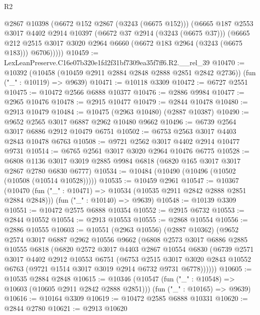 \begin{lexlean}{R2}
\begin{coremodule}
          @2867
          @10398
          (@6672 @152 @2867 (@3243 (@6675 @152)))
          (@6665
            @187
            @2553
            @3017
            @4402
            @2914
            @10397
            (@6672 @37 @2914 (@3243 (@6675 @37)))
            (@6665
              @212
              @2515
              @3017
              @3020
              @2964
              @6660
              (@6672 @183 @2964 (@3243 (@6675 @183)))
              @6706)))))
@10459 := LexLeanPreserve.C16e07b320e1fd2f31bf7309ea35f7ff6.R2.__rel_39
@10470 := @10392
    (@10458 (@10459 @2911 @2884 @2848 @2888 @2851 @2842 @2736))
    (fun ("_" : @10119) => @9639)
@10471 := @10118 @3309
@10472 := @6727 @2551
@10475 := @10472 @2566 @6888 @10377
@10476 := @2886 @9984
@10477 := @2965 @10476
@10478 := @2915 @10477
@10479 := @2844 @10478
@10480 := @2913 @10479
@10484 := @10475 (@2963 @10480) (@2887 @10387)
@10490 := @9652 @2565 @3017 @6887 @2962 @10480 @9662
@10496 := @6739 @2564 @3017 @6886 @2912 @10479 @6751
@10502 := @6753 @2563 @3017 @4403 @2843 @10478 @6763
@10508 := @9721 @2562 @3017 @4402 @2914 @10477 @9731
@10514 := @6765 @2561 @3017 @3020 @2964 @10476 @6775
@10528 := @6808 @1136 @3017 @3019 @2885 @9984 @6818 (@6820 @165 @3017 @3017 @2867 @2780 @6830 @6777)
@10534 := @10484 (@10490 (@10496 (@10502 (@10508 (@10514 @10528)))))
@10535 := @10459 @2961
@10547 := @10367
    (@10470 (fun ("_" : @10471) => @10534 (@10535 @2911 @2842 @2888 @2851 @2884 @2848)))
    (fun ("_" : @10140) => @9639)
@10548 := @10139 @3309
@10551 := @10472 @2575 @6888 @10354
@10552 := @2915 @6732
@10553 := @2844 @10552
@10554 := @2913 @10553
@10555 := @2868 @10554
@10556 := @2886 @10555
@10603 := @10551
    (@2963 @10556)
    (@2887 @10362)
    (@9652
      @2574
      @3017
      @6887
      @2962
      @10556
      @9662
      (@6808
        @2573
        @3017
        @6886
        @2885
        @10555
        @6818
        (@6820
          @2572
          @3017
          @4403
          @2867
          @10554
          @6830
          (@6739
            @2571
            @3017
            @4402
            @2912
            @10553
            @6751
            (@6753
              @2515
              @3017
              @3020
              @2843
              @10552
              @6763
              (@9721 @1514 @3017 @3019 @2914 @6732 @9731 @6778))))))
@10605 := @10535 @2884 @2848
@10615 := @10346
    (@10547 (fun ("_" : @10548) => @10603 (@10605 @2911 @2842 @2888 @2851)))
    (fun ("_" : @10165) => @9639)
@10616 := @10164 @3309
@10619 := @10472 @2585 @6888 @10331
@10620 := @2844 @2780
@10621 := @2913 @10620

\end{coremodule}
\end{lexlean}
